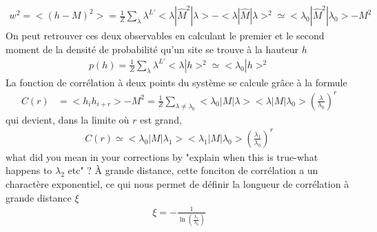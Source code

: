 \begin{align}
	w^2 = < (h - M)^2 > = \frac{1}{Z} \sum_\lambda \lambda^{L'} < \lambda | \hat{M}^2 | \lambda > - < \lambda | \hat{M}| \lambda >^2  \simeq  < \lambda_0 | \hat{M}^2 | \lambda_0 > - M^2
\end{align}
On peut retrouver ces deux observables en calculant le premier et le second moment de la densité de probabilité qu'un site se trouve à la hauteur $h$
\begin{align}
	p(h) = \frac{1}{Z} \sum_\lambda \lambda^{L'} <\lambda | h >^2 \simeq < \lambda_0 | h >^2
\end{align}
La fonction de corrélation à deux points du système se calcule grâce à la formule
\begin{align}
    C(r) &= < h_i h_{i+r} > - M^2 = \frac{1}{Z} \sum_{\lambda \neq \lambda_0} < \lambda_0 | M | \lambda > < \lambda | M | \lambda_0 > \left( \frac{\lambda}{\lambda_0} \right)^r  
\end{align}
qui devient, dans la limite où $r$ est grand, 
\begin{align}
    C(r) \simeq < \lambda_0 | M | \lambda_1 > < \lambda_1 | M | \lambda_0 > \left( \frac{\lambda_1}{\lambda_0} \right)^r
\end{align}
{\color{red} what did you mean in your corrections by "explain when this is true-what happens to $\lambda_2$ etc" ? }
À grande distance, cette fonciton de corrélation a un charactère exponentiel, ce qui nous permet de définir la longueur de corrélation à grande distance $\xi$
\begin{align}
    \xi = - \frac{1}{\ln(\frac{\lambda_1}{\lambda_0})}
    \label{longueur-correl-thermo}
\end{align}

